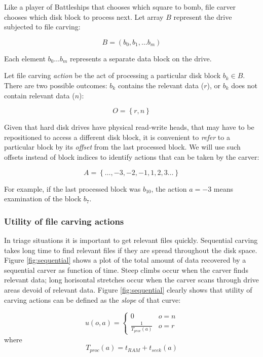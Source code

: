 \documentclass[final,5p,times,twocolumn,authoryear]{elsarticle}
\begin{document}
Like a player of Battleships that chooses which square to bomb, file carver chooses which disk block to process next. Let array $B$ represent the drive subjected to file carving:

\begin{equation}
B=\left(b_0,b_1,\dots b_m \right)
\end{equation}

Each element $b_0 \dots b_m$ represents a separate data block on the drive. 

Let file carving \emph{action} be the act of processing a particular disk block $b_k \in B$. There are two possible outcomes: $b_k$ contains the relevant data ($r$), or $b_k$ does not contain relevant data ($n$):

\begin{equation}
O=\left\{r,n\right\}
\end{equation}

Given that hard disk drives have physical read-write heads, that may have to be repositioned to access a different disk block, it is convenient to \emph{refer} to a particular block by its \emph{offset} from the last processed block. We will use such offsets instead of block indices to identify actions that can be taken by the carver:

\begin{equation}
A=\left\{\dots,-3,-2,-1,1,2,3\dots\right\}
\end{equation}

For example, if the last processed block was $b_{10}$, the action $a=-3$ means examination of the block $b_7$. 

\subsubsection{Utility of file carving actions}
\label{utility-of-carving}

In triage situations it is important to get relevant files quickly. Sequential carving takes long time to find relevant files if they are spread throughout the disk space. Figure \ref{fig:sequential} shows a plot of the total amount of data recovered by a sequential carver as function of time. Steep climbs occur when the carver finds relevant data; long horisontal stretches occur when the carver scans through drive areas devoid of relevant data. Figure \ref{fig:sequential} clearly shows that utility of carving actions can be defined as the \emph{slope} of that curve:

\begin{equation}
\label{eqn:utility-def}
u(o,a)=\begin{cases} 
      0 & o = n \\
      \frac{1}{T_{proc}(a)} & o = r 
   \end{cases}
\end{equation}
where
\begin{equation}
T_{proc}(a) = t_{RAM} + t_{seek}(a)
\end{equation}
\end{document}

